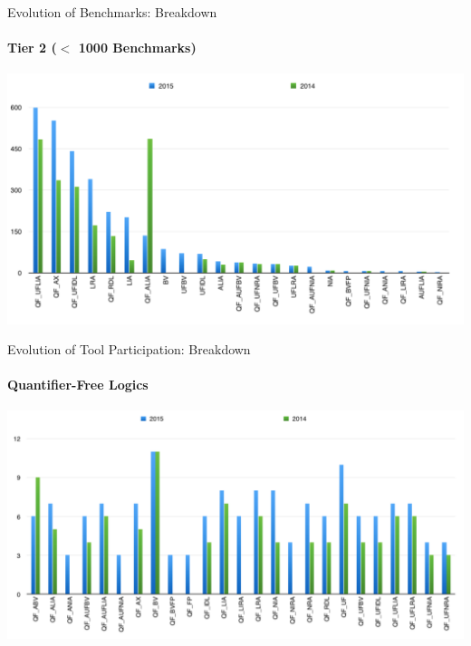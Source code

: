 \documentclass{beamer}
\begin{document}
\begin{frame}{Evolution of Benchmarks: Breakdown}
\framesubtitle{Tier 2 ($<$ 1000 Benchmarks)}

\begin{center}
\includegraphics[width=\textwidth]{benchmarks-logics-tier2}
\end{center}

\end{frame}


\begin{frame}{Evolution of Tool Participation: Breakdown}
\framesubtitle{Quantifier-Free Logics}

\begin{center}
\includegraphics[width=\textwidth]{solvers-logics-without-quantifiers}
\end{center}


\end{frame}

\end{document}
